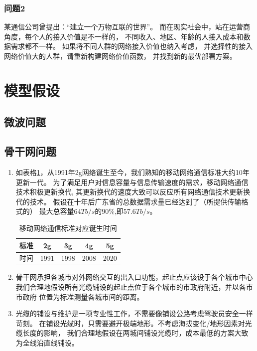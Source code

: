 \documentclass[UTF8,12pt]{ctexart}
\begin{document}
        \subsubsection{问题2}
            某通信公司曾提出：“建立一个万物互联的世界”。
            而在现实社会中，站在运营商角度，每个人的接入价值是不一样的，
            不同收入、地区、年龄的人接入成本和数据需求都不一样。
            如果将不同人群的网络接入价值也纳入考虑，
            并选择性的接入网络价值大的人群，请重新构建网络价值函数，
            并找到新的最优部署方案。
        



\section{模型假设}\label{mxjs}
    \subsection{微波问题}
    \subsection{骨干网问题}
        \begin{enumerate}
        \item 如表格\ref{2g}，从1991年2g网络诞生至今，我们熟知的移动网络通信标准大约10年更新一代。
        为了满足用户对信息容量与信息传输速度的需求，移动网络通信技术积极更新换代,
        其更新换代的速度大致可以反应所有网络通信技术更新换代的技术。
        假设在十年后广东省的总数据需求量已经达到了（所提供传输格式的）
        最大总容量$64Tb/s$的$90\%$,即$57.6Tb/s$。
        \begin{table}[htbp]
            \centering
              \begin{tabular}{ccccc}
              \toprule
              标准     & 2g     & 3g     & 4g     & 5g \\
              \midrule
              时间     & 1991   & 1998   & 2008   & 2020 \\
              \bottomrule
              \end{tabular}%
            \caption{移动网络通信标准对应诞生时间}\label{2g}
          \end{table}%

        \item 骨干网承担各城市对外网络交互的出入口功能，起止点应该设于各个城市中心
            我们合理地假设所有光缆铺设的起止点位于各个城市的市政府附近，并以各市市政府
            位置为标准测量各城市间的距离。
        \item 光缆的铺设与维护是一项专业性工作，不需要像铺设公路考虑驾驶员安全一样苛刻。
            在铺设光缆时，只需要避开极端地形。不考虑海拔变化/地形因素对光缆长度的影响，
            我们合理地假设在两城间铺设光缆时，成本最低的方案大致为全线沿直线铺设。
        \end{enumerate}
\end{document}
